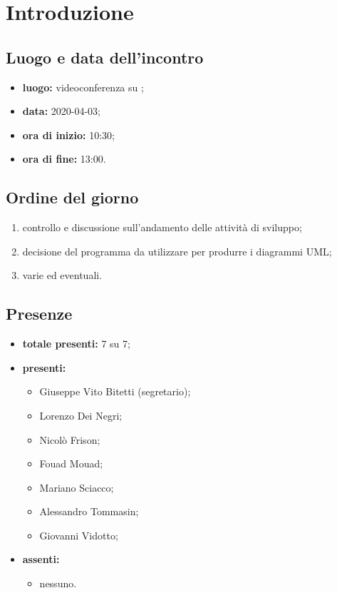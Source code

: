 \section*{Introduzione}

\subsection*{Luogo e data dell'incontro}
	\begin{itemize}
		\item \textbf{luogo:} videoconferenza su ;
		\item \textbf{data:} 2020-04-03;
		\item \textbf{ora di inizio:} 10:30;
		\item \textbf{ora di fine:} 13:00.
	\end{itemize}

\subsection*{Ordine del giorno}
	\begin{enumerate}
			\item controllo e discussione sull'andamento delle attività di sviluppo;
			\item decisione del programma da utilizzare per produrre i diagrammi UML;
			\item varie ed eventuali.
	\end{enumerate}

\subsection*{Presenze}
	\begin{itemize}
		\item \textbf{totale presenti:} 7 su 7;
		\item \textbf{presenti: }
			\begin{itemize}
				\item Giuseppe Vito Bitetti (segretario);
				\item Lorenzo Dei Negri;
				\item Nicolò Frison;
				\item Fouad Mouad;
				\item Mariano Sciacco;
				\item Alessandro Tommasin;
				\item Giovanni Vidotto;
			\end{itemize}
		\item \textbf{assenti: }
			\begin{itemize}
				\item nessuno.
			\end{itemize}
	\end{itemize}


